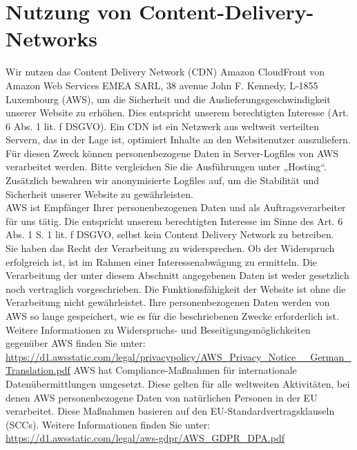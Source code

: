 \documentclass[12pt]{article}
\begin{document}
\part{Nutzung von Content-Delivery-Networks}
Wir nutzen das Content Delivery Network (CDN) Amazon CloudFront von Amazon Web Services EMEA SARL, 38 avenue John F. Kennedy, L-1855 Luxembourg (AWS), um die Sicherheit und die Auslieferungsgeschwindigkeit unserer Website zu erhöhen. Dies entspricht unserem berechtigten Interesse (Art. 6 Abs. 1 lit. f DSGVO). Ein CDN ist ein Netzwerk aus weltweit verteilten Servern, das in der Lage ist, optimiert Inhalte an den Websitenutzer auszuliefern. Für diesen Zweck können personenbezogene Daten in Server-Logfiles von AWS verarbeitet werden. Bitte vergleichen Sie die Ausführungen unter „Hosting“. Zusätzlich bewahren wir anonymisierte Logfiles auf, um die Stabilität und Sicherheit unserer Website zu gewährleisten.\\
AWS ist Empfänger Ihrer personenbezogenen Daten und als Auftragsverarbeiter für uns tätig. Die entspricht unserem berechtigten Interesse im Sinne des Art. 6 Abs. 1 S. 1 lit. f DSGVO, selbst kein Content Delivery Network zu betreiben.\\
Sie haben das Recht der Verarbeitung zu widersprechen. Ob der Widerspruch erfolgreich ist, ist im Rahmen einer Interessenabwägung zu ermitteln. Die Verarbeitung der unter diesem Abschnitt angegebenen Daten ist weder gesetzlich noch vertraglich vorgeschrieben. Die Funktionsfähigkeit der Website ist ohne die Verarbeitung nicht gewährleistet. Ihre personenbezogenen Daten werden von AWS so lange gespeichert, wie es für die beschriebenen Zwecke erforderlich ist.\\
Weitere Informationen zu Widerspruchs- und Beseitigungsmöglichkeiten gegenüber AWS finden Sie unter: \url{https://d1.awsstatic.com/legal/privacypolicy/AWS_Privacy_Notice__German_Translation.pdf} AWS hat Compliance-Maßnahmen für internationale Datenübermittlungen umgesetzt. Diese gelten für alle weltweiten Aktivitäten, bei denen AWS personenbezogene Daten von natürlichen Personen in der EU verarbeitet. Diese Maßnahmen basieren auf den EU-Standardvertragsklauseln (SCCs). Weitere Informationen finden Sie unter: \url{https://d1.awsstatic.com/legal/aws-gdpr/AWS_GDPR_DPA.pdf}
\end{document}
